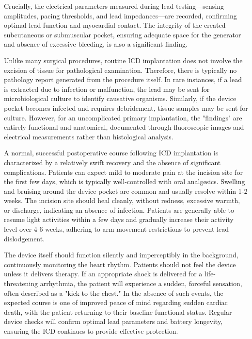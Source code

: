 Crucially, the electrical parameters measured during lead testing---sensing amplitudes, pacing thresholds, and lead impedances---are recorded, confirming optimal lead function and myocardial contact. The integrity of the created subcutaneous or submuscular pocket, ensuring adequate space for the generator and absence of excessive bleeding, is also a significant finding.

Unlike many surgical procedures, routine ICD implantation does not involve the excision of tissue for pathological examination. Therefore, there is typically no pathology report generated from the procedure itself. In rare instances, if a lead is extracted due to infection or malfunction, the lead may be sent for microbiological culture to identify causative organisms. Similarly, if the device pocket becomes infected and requires debridement, tissue samples may be sent for culture. However, for an uncomplicated primary implantation, the "findings" are entirely functional and anatomical, documented through fluoroscopic images and electrical measurements rather than histological analysis.

A normal, successful postoperative course following ICD implantation is characterized by a relatively swift recovery and the absence of significant complications. Patients can expect mild to moderate pain at the incision site for the first few days, which is typically well-controlled with oral analgesics. Swelling and bruising around the device pocket are common and usually resolve within 1-2 weeks. The incision site should heal cleanly, without redness, excessive warmth, or discharge, indicating an absence of infection. Patients are generally able to resume light activities within a few days and gradually increase their activity level over 4-6 weeks, adhering to arm movement restrictions to prevent lead dislodgement.

The device itself should function silently and imperceptibly in the background, continuously monitoring the heart rhythm. Patients should not feel the device unless it delivers therapy. If an appropriate shock is delivered for a life-threatening arrhythmia, the patient will experience a sudden, forceful sensation, often described as a "kick to the chest." In the absence of such events, the expected course is one of improved peace of mind regarding sudden cardiac death, with the patient returning to their baseline functional status. Regular device checks will confirm optimal lead parameters and battery longevity, ensuring the ICD continues to provide effective protection.

